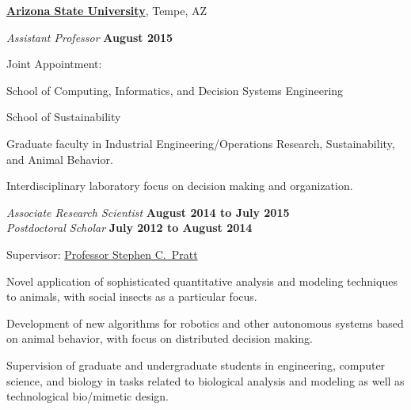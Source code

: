 \documentclass[10pt]{article}
\begin{document}
\href{http://www.asu.edu/}{\textbf{Arizona State University}},
Tempe, AZ
\begin{outerlist}

    \item[] \textit{Assistant Professor}%
            \hfill \textbf{August 2015}
            \begin{innerlist}
                \item Joint Appointment:
                    \begin{innerlist}
                        \item School of Computing, Informatics, and Decision Systems Engineering
                        \item School of Sustainability
                    \end{innerlist}

                \item Graduate faculty in Industrial Engineering/Operations
                    Research, Sustainability, and Animal Behavior.

                \item Interdisciplinary laboratory focus on decision
                    making and organization.
            \end{innerlist}

    \item[] \textit{Associate Research Scientist}%
            \hfill \textbf{August 2014 to July 2015}\\
        \textit{Postdoctoral Scholar}%
            \hfill \textbf{July 2012 to August 2014}
            \begin{innerlist}
                \item Supervisor:
                        \href{http://www.public.asu.edu/~spratt1/}%
                             {Professor Stephen C.~Pratt}

                \item Novel application of sophisticated quantitative
                    analysis and modeling techniques to animals, with
                    social insects as a particular focus.

                \item Development of new algorithms for robotics and
                    other autonomous systems based on animal behavior,
                    with focus on distributed decision making.

                \item Supervision of graduate and undergraduate students
                    in engineering, computer science, and biology in
                    tasks related to biological analysis and modeling as
                    well as technological bio\-/mimetic design.
            \end{innerlist}

\end{outerlist}
\end{document}
